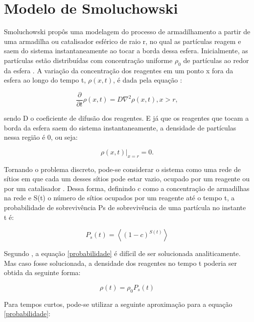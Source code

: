
\section{Modelo de Smoluchowski}

Smoluchowski propôs uma modelagem do processo de armadilhamento a partir de uma
armadilha ou catalisador esférico de raio r, no qual as partículas reagem e saem
do sistema instantaneamente ao tocar a borda dessa esfera. Inicialmente, as
partículas estão distribuídas com concentração uniforme $\rho_0$ de partículas
ao redor da esfera \cite{3}. A variação da concentração dos reagentes em um
ponto x fora da esfera ao longo do tempo t, $\rho(x,t)$, é dada pela equação
 \cite{3}:

\begin{equation}
  \frac{\partial}{\partial t}\rho(x,t) = D\nabla^2\rho(x,t), x>r,
\end{equation}

\noindent sendo D o coeficiente de difusão dos reagentes. E já que os reagentes
que tocam a borda da esfera saem do sistema instantaneamente, a densidade de
partículas nessa região é 0, ou seja: \cite{3}

\begin{equation}
\rho(x,t)|_{x=r} = 0.
\end{equation}

Tornando o problema discreto, pode-se considerar o sistema como uma rede de
sítios em que cada um desses sítios pode estar vazio, ocupado por um reagente
ou por um catalisador \cite{3}.  Dessa forma, definindo c como a concentração de
armadilhas na rede e S(t) o número de sítios ocupados por um reagente até o
tempo t, a probabilidade de sobrevivência Ps de sobrevivência de uma partícula
no instante t é: \cite{6}

\begin{equation}
P_s(t) = \left<(1-c)^{S(t)}\right>
\label{probabilidade}
\end{equation}

Segundo \cite{3}, a equação \ref{probabilidade} é difícil de ser solucionada
analiticamente. Mas caso fosse solucionada, a densidade dos reagentes no tempo
t poderia ser obtida da seguinte forma:

\begin{equation}
\rho(t) = \rho_0P_s(t)
\end{equation}

Para tempos curtos, pode-se utilizar a seguinte aproximação para a equação
\ref{probabilidade}:

